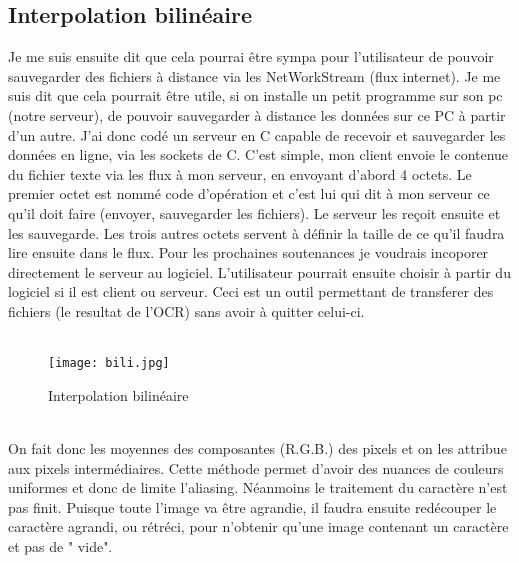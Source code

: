 \documentclass{article}
\begin{document}
                \subsection{Interpolation bilinéaire}
Je me suis ensuite dit que cela pourrai être sympa pour l’utilisateur de pouvoir sauvegarder des fichiers à distance via les NetWorkStream (flux internet). Je me suis dit que cela pourrait être utile, si on installe un petit programme sur son pc (notre serveur), de pouvoir sauvegarder à distance les données sur ce PC à partir d’un autre. J’ai donc codé un serveur en C capable de recevoir et sauvegarder les données en ligne, via les sockets de C. C’est simple, mon client envoie le contenue du fichier texte via les flux à mon serveur, en envoyant d’abord 4 octets. Le premier octet est nommé code d’opération et c’est lui qui dit à mon serveur ce qu’il doit faire (envoyer, sauvegarder les fichiers). Le serveur les reçoit ensuite et les sauvegarde. Les trois autres octets servent à définir la taille de ce qu’il faudra lire ensuite dans le flux. Pour les prochaines soutenances je voudrais incoporer directement le serveur au logiciel. L’utilisateur pourrait ensuite choisir à partir du logiciel si il est client ou serveur. Ceci est un outil permettant de transferer des fichiers (le resultat de l’OCR) sans avoir à quitter celui-ci.\\
\\
    \begin{figure}[hp]
	    \centering
	    \texttt{[image: bili.jpg]}
	    \caption{Interpolation bilinéaire}
    \end{figure}
\\
On fait donc les moyennes des composantes (R.G.B.) des pixels et on les attribue aux pixels intermédiaires. Cette méthode permet d’avoir des nuances de couleurs uniformes et donc de limite l’aliasing. Néanmoins le traitement du caractère n’est pas finit. Puisque toute l’image va être agrandie, il faudra ensuite redécouper le caractère agrandi, ou rétréci, pour n’obtenir qu’une image contenant un caractère et pas de " vide".\\
\end{document}
